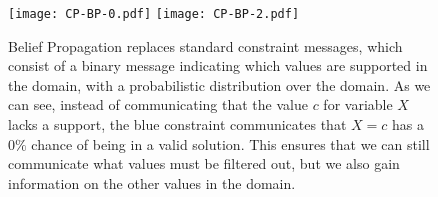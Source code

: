 \documentclass[../Document.tex]{subfiles}
\begin{document}
\begin{figure}[ht]
    \centering
    \texttt{[image: CP-BP-0.pdf]}
    \texttt{[image: CP-BP-2.pdf]}
    \caption[\acrlong{cpbp} messaging.]{Belief Propagation replaces standard constraint messages, which consist of a binary message indicating which values are supported in the domain, with a probabilistic distribution over the domain. As we can see, instead of communicating that the value $c$ for variable $X$ lacks a support, the blue constraint communicates that $X=c$ has a $0\%$ chance of being in a valid solution. This ensures that we can still communicate what values must be filtered out, but we also gain information on the other values in the domain.}
    \label{fig:cpbp_messaging}
\end{figure}
\end{document}
